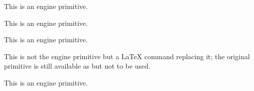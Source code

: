 \begin{function}[]
  {
    \escapechar
  }
  \begin{syntax}
  \end{syntax}
  This is an engine primitive.
\end{function}



\begin{function}[]
  {
    \evensidemargin
  }
  \begin{syntax}
  \end{syntax}

\end{function}



\begin{variable}[]
  {
    \everycr
  }
  This is an engine primitive.
\end{variable}



\begin{variable}[]
  {
    \everyjob
  }
  This is an engine primitive.
\end{variable}



\begin{variable}[]
  {
    \everypar
  }
  This is not the engine primitive  but a \LaTeX{} command
  replacing it; the original primitive is still available as
   but not to be used.
\end{variable}



\begin{function}[]
  {
    \exhyphenpenalty
  }
  \begin{syntax}
  \end{syntax}
  This is an engine primitive.
\end{function}



\begin{function}[]
  {
    \expand@font@defaults
  }
  \begin{syntax}
  \end{syntax}

\end{function}



\begin{function}[]
  {
    \expandableinput
  }
  \begin{syntax}
  \end{syntax}

\end{function}



